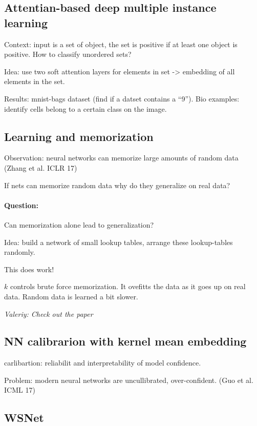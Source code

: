 \documentclass[11pt,oneside,a4paper]{scrartcl}
\newcommand{\valeriy}[1]{{\color{blue}\textit{Valeriy: #1}}}
\begin{document}
\subsection{Attentian-based deep multiple instance learning}
\label{sec:attentian-based-deep}

Context: input is a set of object, the set is positive if at least one object
is positive. How to classify unordered sets?

Idea: use two soft attention layers for elements in set -> embedding
of all elements in the set.

Results: mnist-bags dataset (find if a datset contains a ``9''). Bio
examples: identify cells belong to a certain class on the image.

\subsection{Learning and memorization \cite{chatterjee18a}}
\label{sec:learn-memor}

Observation: neural networks can memorize large amounts of random data
(Zhang et al. ICLR 17)

If nets can memorize random data why do they generalize on real data?

\paragraph{Question:}
 Can memorization alone lead to generalization?

Idea: build a network of small lookup tables, arrange these
lookup-tables randomly.

This does work!

$k$ controls brute force memorization. It ovefitts the data as it goes
up on real data. Random data is learned a bit slower.

\valeriy{Check out the paper}

\subsection{NN calibrarion with kernel mean embedding}
\label{sec:nn-calibrarion-with}

carlibartion: reliabilit and interpretability of model confidence.

Problem: modern neural networks are uncullibrated,
over-confident. (Guo et al. ICML 17)

\subsection{WSNet}
\label{sec:wsnet}
\end{document}
